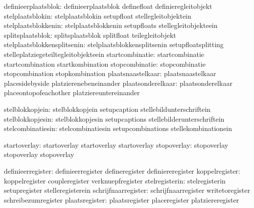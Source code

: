           definieerplaatsblok:  definieerplaatsblok          definefloat
                                definieregleitobjekt
             stelplaatsblokin:  stelplaatsblokin             setupfloat
                                stellegleitobjektein
          stelplaatsblokkenin:  stelplaatsblokkenin          setupfloats
                                stellegleitobjekteein
             splitsplaatsblok:  splitsplaatsblok             splitfloat
                                teilegleitobjekt
  stelplaatsblokkensplitsenin:  stelplaatsblokkensplitsenin  setupfloatsplitting
                                stelleplatziegeteiltegleitobjekteein
              startcombinatie:  startcombinatie              startcombination
                                startkombination
               stopcombinatie:  stopcombinatie               stopcombination
                                stopkombination
            plaatsnaastelkaar:  plaatsnaastelkaar            placesidebyside
                                platzierenebeneinander
            plaatsonderelkaar:  plaatsonderelkaar            placeontopofeachother
                                platziereuntereinander

              stelblokkopjein:  stelblokkopjein              setupcaption
                                stellebildunterschriftein
             stelblokkopjesin:  stelblokkopjesin             setupcaptions
                                stellebilderunterschriftein
            stelcombinatiesin:  stelcombinatiesin            setupcombinations
                                stellekombinationein

                 startoverlay:  startoverlay                 startoverlay
                                startoverlay
                  stopoverlay:  stopoverlay                  stopoverlay
                                stopoverlay

            definieerregister:  definieerregister            defineregister
                                definiereregister
               koppelregister:  koppelregister               coupleregister
                                verknuepfregister
               stelregisterin:  stelregisterin               setupregister
                                stelleregisterein
          schrijfnaarregister:  schrijfnaarregister          writetoregister
                                schreibezumregister
               plaatsregister:  plaatsregister               placeregister
                                platziereregister

